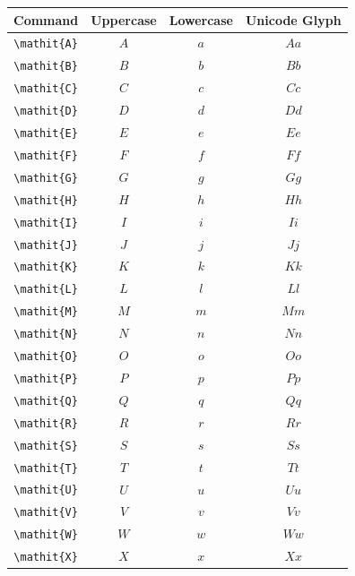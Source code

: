 \documentclass[12pt,a4paper]{article}
\begin{document}
\begin{longtable}{|c|c|c|c|}
\hline
\textbf{Command} & \textbf{Uppercase} & \textbf{Lowercase} & \textbf{Unicode Glyph} \\
\hline
\verb|\mathit{A}| & $\mathit{A}$ & $\mathit{a}$ & $ 𝐴 𝑎 $ \\
\verb|\mathit{B}| & $\mathit{B}$ & $\mathit{b}$ & $ 𝐵 𝑏 $ \\
\verb|\mathit{C}| & $\mathit{C}$ & $\mathit{c}$ & $ 𝐶 𝑐 $ \\
\verb|\mathit{D}| & $\mathit{D}$ & $\mathit{d}$ & $ 𝐷 𝑑 $ \\
\verb|\mathit{E}| & $\mathit{E}$ & $\mathit{e}$ & $ 𝐸 𝑒 $ \\
\verb|\mathit{F}| & $\mathit{F}$ & $\mathit{f}$ & $ 𝐹 𝑓 $ \\
\verb|\mathit{G}| & $\mathit{G}$ & $\mathit{g}$ & $ 𝐺 𝑔 $ \\
\verb|\mathit{H}| & $\mathit{H}$ & $\mathit{h}$ & $ 𝐻 ℎ $ \\
\verb|\mathit{I}| & $\mathit{I}$ & $\mathit{i}$ & $ 𝐼 𝑖 $ \\
\verb|\mathit{J}| & $\mathit{J}$ & $\mathit{j}$ & $ 𝐽 𝑗 $ \\
\verb|\mathit{K}| & $\mathit{K}$ & $\mathit{k}$ & $ 𝐾 𝑘 $ \\
\verb|\mathit{L}| & $\mathit{L}$ & $\mathit{l}$ & $ 𝐿 𝑙 $ \\
\verb|\mathit{M}| & $\mathit{M}$ & $\mathit{m}$ & $ 𝑀 𝑚 $ \\
\verb|\mathit{N}| & $\mathit{N}$ & $\mathit{n}$ & $ 𝑁 𝑛 $ \\
\verb|\mathit{O}| & $\mathit{O}$ & $\mathit{o}$ & $ 𝑂 𝑜 $ \\
\verb|\mathit{P}| & $\mathit{P}$ & $\mathit{p}$ & $ 𝑃 𝑝 $ \\
\verb|\mathit{Q}| & $\mathit{Q}$ & $\mathit{q}$ & $ 𝑄 𝑞 $ \\
\verb|\mathit{R}| & $\mathit{R}$ & $\mathit{r}$ & $ 𝑅 𝑟 $ \\
\verb|\mathit{S}| & $\mathit{S}$ & $\mathit{s}$ & $ 𝑆 𝑠 $ \\
\verb|\mathit{T}| & $\mathit{T}$ & $\mathit{t}$ & $ 𝑇 𝑡 $ \\
\verb|\mathit{U}| & $\mathit{U}$ & $\mathit{u}$ & $ 𝑈 𝑢 $ \\
\verb|\mathit{V}| & $\mathit{V}$ & $\mathit{v}$ & $ 𝑉 𝑣 $ \\
\verb|\mathit{W}| & $\mathit{W}$ & $\mathit{w}$ & $ 𝑊 𝑤 $ \\
\verb|\mathit{X}| & $\mathit{X}$ & $\mathit{x}$ & $ 𝑋 𝑥 $ \\

\end{longtable}
\end{document}

